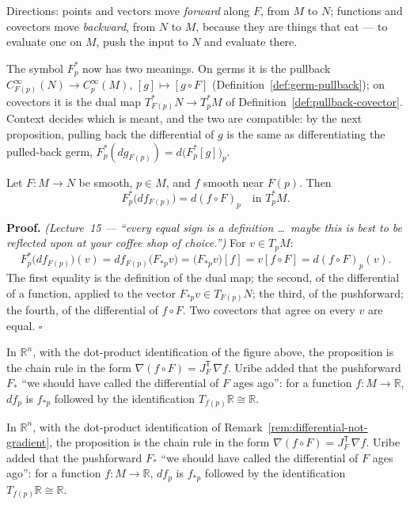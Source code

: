 \documentclass[11pt]{report}
\makeatletter
\newcounter{thmcounter}[section]
\renewenvironment{proof}[1][Proof]{\noindent\textbf{#1.} }{\hfill$\square$\par\vspace{5pt}}
\newcommand{\thmlabel}[1]{\edef\@currentlabel{\arabic{section}.\arabic{thmcounter}}\label{#1}}
\newcommand{\leeref}[1]{\par\smallskip{\raggedleft\footnotesize\textsc{Lee}:\ #1\par}}
\makeatother
\begin{document}
Directions: points and vectors move \emph{forward} along $F$, from $M$ to $N$; functions and covectors move \emph{backward}, from $N$ to $M$, because they are things that eat --- to evaluate one on $M$, push the input to $N$ and evaluate there.

\begin{rembox}\label{rem:two-pullbacks}
The symbol $F_p^*$ now has two meanings. On germs it is the pullback $C^\infty_{F(p)}(N) \to C^\infty_p(M)$, $[g] \mapsto [g \circ F]$ (Definition~\ref{def:germ-pullback}); on covectors it is the dual map $T^*_{F(p)}N \to T_p^*M$ of Definition~\ref{def:pullback-covector}. Context decides which is meant, and the two are compatible: by the next proposition, pulling back the differential of $g$ is the same as differentiating the pulled-back germ, $F_p^*(dg_{F(p)}) = d\big(F_p^*[g]\big)_p$.
\end{rembox}

\begin{propbox}\thmlabel{prop:pullback-d}
Let $F : M \to N$ be smooth, $p \in M$, and $f$ smooth near $F(p)$. Then
\[
F_p^*\big(df_{F(p)}\big) = d(f \circ F)_p \quad \text{in } T_p^*M .
\]
\leeref{Proposition 11.25}
\end{propbox}

\begin{proof}
\textit{(Lecture~15 --- ``every equal sign is a definition \ldots\ maybe this is best to be reflected upon at your coffee shop of choice.'')} For $v \in T_pM$:
\[
F_p^*\big(df_{F(p)}\big)(v) = df_{F(p)}\big(F_{*p}v\big) = \big(F_{*p}v\big)[f] = v[f \circ F] = d(f \circ F)_p(v) .
\]
The first equality is the definition of the dual map; the second, of the differential of a function, applied to the vector $F_{*p}v \in T_{F(p)}N$; the third, of the pushforward; the fourth, of the differential of $f \circ F$. Two covectors that agree on every $v$ are equal.
\end{proof}

In $\mathbb{R}^n$, with the dot-product identification of the figure above, the proposition is the chain rule in the form $\nabla(f \circ F) = J_F^{\mathsf T}\, \nabla f$. Uribe added that the pushforward $F_*$ ``we should have called the differential of $F$ ages ago'': for a function $f : M \to \mathbb{R}$, $df_p$ is $f_{*p}$ followed by the identification $T_{f(p)}\mathbb{R} \cong \mathbb{R}$.

\begin{rembox}\label{rem:pullback-d-chain-rule}
In $\mathbb{R}^n$, with the dot-product identification of Remark~\ref{rem:differential-not-gradient}, the proposition is the chain rule in the form $\nabla(f \circ F) = J_F^{\mathsf T}\, \nabla f$. Uribe added that the pushforward $F_*$ ``we should have called the differential of $F$ ages ago'': for a function $f : M \to \mathbb{R}$, $df_p$ is $f_{*p}$ followed by the identification $T_{f(p)}\mathbb{R} \cong \mathbb{R}$.
\end{rembox}
\end{document}
